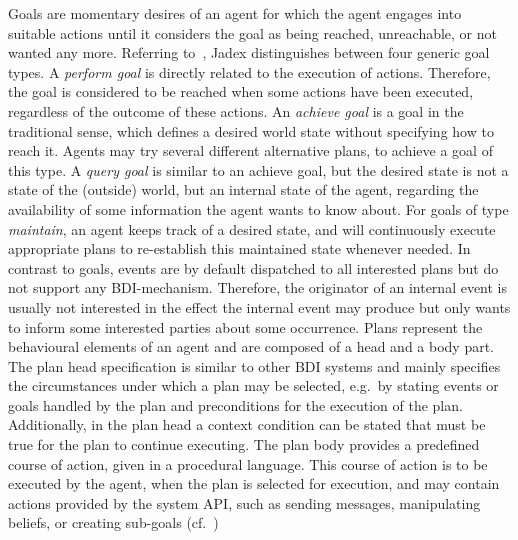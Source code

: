 Goals are momentary desires of an agent for which the agent engages into suitable actions until it considers the goal as being reached, unreachable, or not wanted any more.
Referring to~\cite{ActiveComponentsGoals}, Jadex distinguishes between four generic goal types.
A \emph{perform goal} is directly related to the execution of actions.
Therefore, the goal is considered to be reached when some actions have been executed, regardless of the outcome of these actions.
An \emph{achieve goal} is a goal in the traditional sense, which defines a desired world state without specifying how to reach it.
Agents may try several different alternative plans, to achieve a goal of this type.
A \emph{query goal} is similar to an achieve goal, but the desired state is not a state of the (outside) world, but an internal state of the agent, regarding the availability of some information the agent wants to know about.
For goals of type \emph{maintain}, an agent keeps track of a desired state, and will continuously execute appropriate plans to re-establish this maintained state whenever needed.
In contrast to goals, events are by default dispatched to all interested plans but do not support any BDI-mechanism.
Therefore, the originator of an internal event is usually not interested in the effect the internal event may produce but only wants to inform some interested parties about some occurrence.
Plans represent the behavioural elements of an agent and are composed of a head and a body part.
The plan head specification is similar to other BDI systems and mainly specifies the circumstances under which a plan may be selected, e.g.\ by stating events or goals handled by the plan and preconditions for the execution of the plan.
Additionally, in the plan head a context condition can be stated that must be true for the plan to continue executing.
The plan body provides a predefined course of action, given in a procedural language.
This course of action is to be executed by the agent, when the plan is selected for execution, and may contain actions provided by the system API, such as sending messages, manipulating beliefs, or creating sub-goals (cf.~\cite{braubach_jadex_2004})

